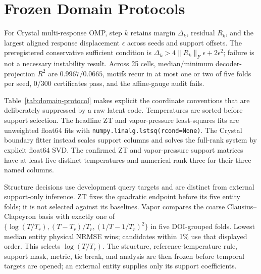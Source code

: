 \appendix
\section{Frozen Domain Protocols}
\label{app:protocol}

For Crystal multi-response OMP, step $k$ retains margin $\Delta_k$, residual
$R_k$, and the largest aligned response displacement $\epsilon$ across seeds and
support offsets.  The preregistered conservative sufficient condition is
$\Delta_k>4\lVert R_k\rVert_F\epsilon+2\epsilon^2$; failure is not a necessary
instability result.  Across 25 cells, median/minimum decoder-projection $R^2$ are
$0.9967/0.0665$, motifs recur in at most one or two of five folds per seed,
0/300 certificates pass, and the affine-gauge audit fails.

Table~\ref{tab:domain-protocol} makes explicit the coordinate conventions that
are deliberately suppressed by a raw latent code.  Temperatures are sorted
before support selection.  The headline ZT and vapor-pressure least-squares
fits are unweighted float64 fits with
\texttt{numpy.linalg.lstsq(rcond=None)}.  The Crystal boundary fitter instead scales
support columns and solves the full-rank system by explicit float64 SVD.  The
confirmed ZT and vapor-pressure support matrices have at least five distinct
temperatures and numerical rank three for their three named columns.

Structure decisions use development query targets and are distinct from
external support-only inference.  ZT fixes the quadratic endpoint before its
five entity folds; it is not selected against its baselines.  Vapor compares
the coarse Clausius--Clapeyron basis with exactly one of
$\{\log(T/T_r),(T-T_r)/T_r,(1/T-1/T_r)^2\}$ in five DOI-grouped folds.  Lowest
median entity physical NRMSE wins; candidates within 1\% use that displayed
order.  This selects $\log(T/T_r)$.  The structure, reference-temperature rule,
support mask, metric, tie break, and analysis are then frozen before temporal
targets are opened; an external entity supplies only its support coefficients.

